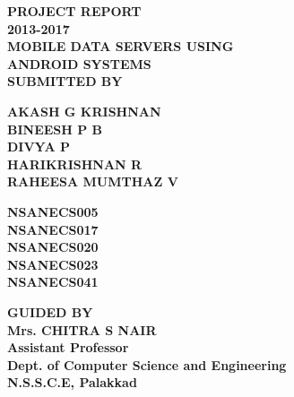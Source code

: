 \documentclass[12pt, a4paper]{article}
\begin{document}
\begin{titlepage}
\begin{center}
{\normalsize \textbf{ PROJECT REPORT \\ 2013-2017}}\\[0.8cm]
  {\Large \textbf{MOBILE DATA SERVERS USING }}\\[0.2cm]
    {\Large \textbf{ ANDROID SYSTEMS}}\\[0.5cm]
\textcolor{red!40!orange}{\fontsize{13pt}{1pt}  \textbf{SUBMITTED BY}}\\[5mm]
\hspace{15mm}
\begin{minipage}{.366\textwidth}
\textbf{AKASH G KRISHNAN}\\[2mm]
\textbf{BINEESH P B}\\[2mm]
\textbf{DIVYA P}\\[2mm]
\textbf{HARIKRISHNAN R}\\[2mm]
\textbf{RAHEESA MUMTHAZ V}\\
\end{minipage}
\begin{minipage}{.2\textwidth}
\textbf{NSANECS005}\\[2mm]
\textbf{NSANECS017}\\[2mm]
\textbf{NSANECS020}\\[2mm]
\textbf{NSANECS023}\\[2mm]
\textbf{NSANECS041}\\
\end{minipage}
\newline
\vspace*{1mm}

\textcolor{red!40!orange}{\fontsize{13pt}{1pt}  \textbf{GUIDED BY}}\\[2mm]
{\normalsize \textbf{Mrs. CHITRA S NAIR}}\\[1mm]
{\normalsize \textbf{Assistant Professor}}\\[1mm]
{\normalsize \textbf{Dept. of Computer Science and Engineering}}\\[1mm]
{\normalsize \textbf{N.S.S.C.E, Palakkad}}\\[2mm]

\end{center}
\end{titlepage}
\newpage
\end{document}
